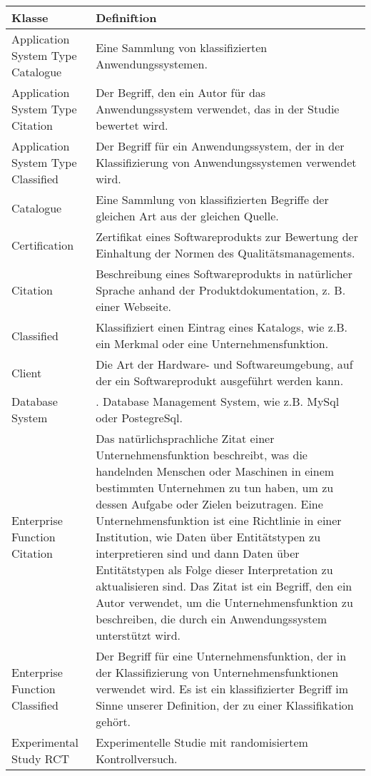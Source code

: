 \begin{longtable}{ | p{4 cm} | p{7 cm} | }
\hline
\textbf{Klasse} & \textbf{Definiftion} \\ \hline
\endhead
Application System Type Catalogue & Eine Sammlung von klassifizierten Anwendungssystemen. \\
\hline
Application System Type Citation & Der Begriff, den ein Autor für das Anwendungssystem verwendet, das in der Studie bewertet wird. \\
\hline
Application System Type Classified & Der Begriff für ein Anwendungssystem, der in der Klassifizierung von Anwendungssystemen verwendet wird. \\
\hline
Catalogue & Eine Sammlung von klassifizierten Begriffe der gleichen Art aus der gleichen Quelle. \\
\hline
Certification & Zertifikat eines Softwareprodukts zur Bewertung der Einhaltung der Normen des Qualitätsmanagements. \\
\hline
Citation & Beschreibung eines Softwareprodukts in natürlicher Sprache anhand der Produktdokumentation, z. B. einer Webseite. \\
\hline
Classified & Klassifiziert einen Eintrag eines Katalogs, wie z.B. ein Merkmal oder eine Unternehmensfunktion. \\
\hline
Client & Die Art der Hardware- und Softwareumgebung, auf der ein Softwareprodukt ausgeführt werden kann. \\
\hline
Database System &. Database Management System, wie z.B. MySql oder PostegreSql.\\
\hline
Enterprise Function Citation & Das natürlichsprachliche Zitat einer Unternehmensfunktion beschreibt, was die handelnden Menschen oder Maschinen in einem bestimmten Unternehmen zu tun haben, um zu dessen Aufgabe oder Zielen beizutragen. Eine Unternehmensfunktion ist eine Richtlinie in einer Institution, wie Daten über Entitätstypen zu interpretieren sind und dann Daten über Entitätstypen als Folge dieser Interpretation zu aktualisieren sind. Das Zitat ist ein Begriff, den ein Autor verwendet, um die Unternehmensfunktion zu beschreiben, die durch ein Anwendungssystem unterstützt wird. \\
\hline
Enterprise Function Classified & Der Begriff für eine Unternehmensfunktion, der in der Klassifizierung von Unternehmensfunktionen verwendet wird. Es ist ein klassifizierter Begriff im Sinne unserer Definition, der zu einer Klassifikation gehört. \\
\hline
Experimental Study RCT &  Experimentelle Studie mit randomisiertem Kontrollversuch. \\

\end{longtable}
